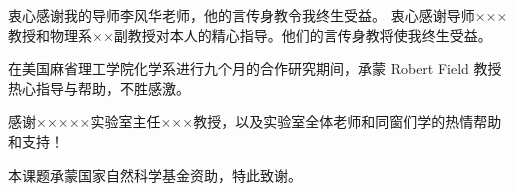 
\begin{acknowledgements}
  衷心感谢我的导师李风华老师，他的言传身教令我终生受益。
  衷心感谢导师×××教授和物理系××副教授对本人的精心指导。他们的言传身教将使我终生受益。

  在美国麻省理工学院化学系进行九个月的合作研究期间，承蒙 Robert Field 教授热心指导与帮助，不胜感激。

  感谢×××××实验室主任×××教授，以及实验室全体老师和同窗们学的热情帮助和支持！

  本课题承蒙国家自然科学基金资助，特此致谢。
\end{acknowledgements}
